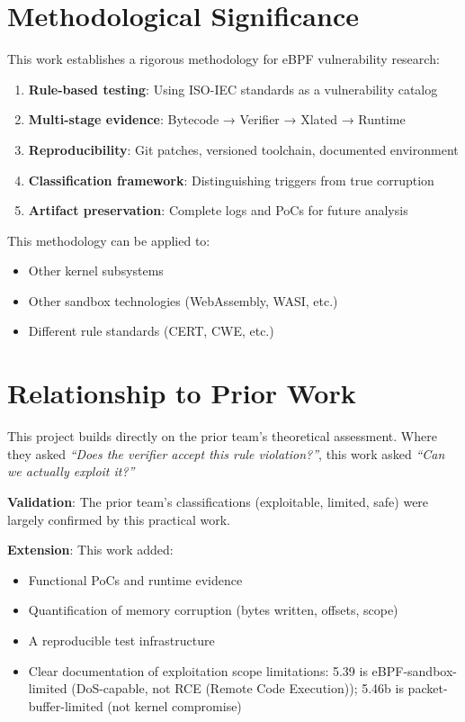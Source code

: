 \section{Methodological Significance}

This work establishes a rigorous methodology for eBPF vulnerability research:

\begin{enumerate}[label=\arabic*.]
  \item \textbf{Rule-based testing}: Using ISO-IEC standards as a vulnerability catalog
  \item \textbf{Multi-stage evidence}: Bytecode → Verifier → Xlated → Runtime
  \item \textbf{Reproducibility}: Git patches, versioned toolchain, documented environment
  \item \textbf{Classification framework}: Distinguishing triggers from true corruption
  \item \textbf{Artifact preservation}: Complete logs and PoCs for future analysis
\end{enumerate}

This methodology can be applied to:
\begin{itemize}
  \item Other kernel subsystems
  \item Other sandbox technologies (WebAssembly, WASI, etc.)
  \item Different rule standards (CERT, CWE, etc.)
\end{itemize}

\section{Relationship to Prior Work}

This project builds directly on the prior team's theoretical assessment. Where they asked \textit{``Does the verifier accept this rule violation?''}, this work asked \textit{``Can we actually exploit it?''}

\textbf{Validation}: The prior team's classifications (exploitable, limited, safe) were largely confirmed by this practical work.

\textbf{Extension}: This work added:
\begin{itemize}
  \item Functional PoCs and runtime evidence
  \item Quantification of memory corruption (bytes written, offsets, scope)
  \item A reproducible test infrastructure
  \item Clear documentation of exploitation scope limitations: 5.39 is eBPF-sandbox-limited (DoS-capable, not RCE (Remote Code Execution)); 5.46b is packet-buffer-limited (not kernel compromise)
\end{itemize}

